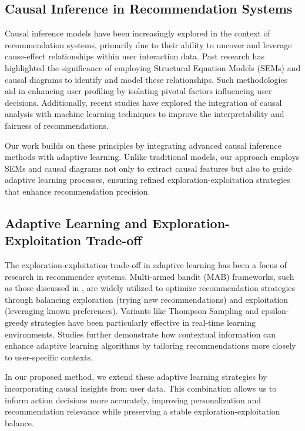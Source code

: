 \documentclass{article} %
\begin{document}
\subsection{Causal Inference in Recommendation Systems}

Causal inference models have been increasingly explored in the context of recommendation systems, primarily due to their ability to uncover and leverage cause-effect relationships within user interaction data. Past research \citep{Pearl2009Causality, Shmueli2010Explanatory, Spirtes2000Causal, Peters2017Elements}has highlighted the significance of employing Structural Equation Models (SEMs) and causal diagrams to identify and model these relationships. Such methodologies aid in enhancing user profiling by isolating pivotal factors influencing user decisions. Additionally, recent studies \citep{Louizos2017Causal, Yao2021Debiased} have explored the integration of causal analysis with machine learning techniques to improve the interpretability and fairness of recommendations.

Our work builds on these principles by integrating advanced causal inference methods with adaptive learning. Unlike traditional models, our approach employs SEMs and causal diagrams not only to extract causal features but also to guide adaptive learning processes, ensuring refined exploration-exploitation strategies that enhance recommendation precision.

\subsection{Adaptive Learning and Exploration-Exploitation Trade-off}

The exploration-exploitation trade-off in adaptive learning has been a focus of research in recommender systems. Multi-armed bandit (MAB) frameworks, such as those discussed in \citep{Gittins2011Multi,Auer2002Using,Vermorel2005Multi,Russo2018Tutorial,Bubeck2012Regret}, are widely utilized to optimize recommendation strategies through balancing exploration (trying new recommendations) and exploitation (leveraging known preferences). Variants like Thompson Sampling and epsilon-greedy strategies have been particularly effective in real-time learning environments. Studies \citep{Zhou2015Survey,Li2010Contextual} further demonstrate how contextual information can enhance adaptive learning algorithms by tailoring recommendations more closely to user-specific contexts.

In our proposed method, we extend these adaptive learning strategies by incorporating causal insights from user data. This combination allows us to inform action decisions more accurately, improving personalization and recommendation relevance while preserving a stable exploration-exploitation balance.
\end{document}
